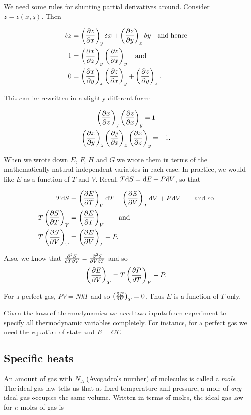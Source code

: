 \documentclass{notes}
\newcommand{\pdf}[3]{\left(\pd{#1}{#2}\right)_{#3}}
\begin{document}
We need some rules for shunting partial derivatives around.
Consider $z = z(x,y)$.  Then

\begin{align*}
\delta z & = \pdf{z}{x}{y} \delta x + \pdf{z}{y}{x} \delta y \quad \text{and
hence} \\
1 & = \pdf{x}{z}{y} \pdf{z}{x}{y} \quad \text{and} \\
0 &= \pdf{x}{y}{z} \pdf{z}{x}{y} + \pdf{z}{y}{x}. 
\end{align*}

This can be rewritten in a slightly different form:

\begin{equation}\label{eq:pdshunt}
\begin{gathered}
\pdf{x}{z}{y} \pdf{z}{x}{y} = 1 \\
\pdf{x}{y}{z} \pdf{y}{x}{z} \pdf{x}{z}{y} = -1.
\end{gathered}
\end{equation}

When we wrote down $E$, $F$, $H$ and $G$ we wrote them in terms of the
mathematically natural independent variables in each case.  In practice,
we would like $E$ as a function of $T$ and $V$.  Recall
$T \mathrm{d} S = \mathrm{d} E + P \mathrm{d} V$, so that

\begin{align*}
T \ud S & = \pdf{E}{T}{V} \ud T + \pdf{E}{V}{T} \ud V + P \ud V \qquad
\text{and so} \\
T \pdf{S}{T}{V} &= \pdf{E}{T}{V} \qquad \text{and}\\
T \pdf{S}{V}{T} &= \pdf{E}{V}{T} + P.
\end{align*}

Also, we know that $\frac{\partial ^2 S}{\partial T \partial V} = \frac{\partial ^2 S}{\partial V \partial T}$
and so
\[
\pdf{E}{V}{T} = T \pdf{P}{T}{V} - P.
\]

For a perfect gas, $PV = NkT$ and so $\pdf{E}{V}{T} = 0$.  Thus
$E$ is a function of $T$ only.

Given the laws of thermodynamics we need two inputs from experiment
to specify all thermodynamic variables completely.  For instance,
for a perfect gas we need the equation of state and $E = C T$.

\subsection{Specific heats}

An amount of gas with $N_A$ (Avogadro's number) of molecules is called
a \emph{mole}.  The ideal gas law tells us that at fixed temperature and
pressure, a mole of \emph{any} ideal gas occupies the same volume.
Written in terms of moles, the ideal gas law for $n$ moles of gas is
\end{document}
